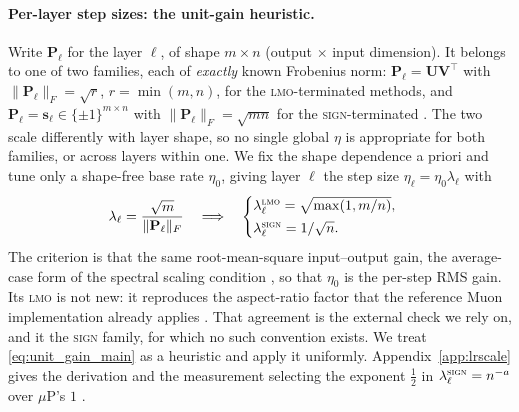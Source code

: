 \paragraph{Per-layer step sizes: the unit-gain heuristic.} Write $\mathbf{P}_\ell$ for the  layer $\ell$, of shape $m\times n$ (output $\times$ input dimension). It belongs to one of two families, each of \emph{exactly} known Frobenius norm: $\mathbf{P}_\ell=\mathbf{U}\mathbf{V}^\top$ with $\|\mathbf{P}_\ell\|_F=\sqrt{r}$, $r=\min(m,n)$, for the \textsc{lmo}-terminated methods, and $\mathbf{P}_\ell=\mathbf{s}_\ell\in\{\pm1\}^{m\times n}$ with $\|\mathbf{P}_\ell\|_F=\sqrt{mn}$ for the \textsc{sign}-terminated .  The two scale differently with layer shape, so no single global $\eta$ is appropriate for both families, or across layers within one. We fix the shape dependence a priori and tune only a shape-free base rate $\eta_0$, giving layer $\ell$ the step size $\eta_\ell=\eta_0\lambda_\ell$ with
\begin{equation}
\label{eq:unit_gain_main}
\lambda_\ell=\frac{\sqrt{m}}{\|\mathbf{P}_\ell\|_F}
\quad\Longrightarrow\quad
\begin{cases}
\lambda_\ell^{\textsc{lmo}}=\sqrt{\max(1,m/n)},\\[2pt]
\lambda_\ell^{\textsc{sign}}=1/\sqrt{n}.
\end{cases}
\end{equation}
The criterion is that  the same root-mean-square input--output gain, the average-case form of the spectral scaling condition \citep{yang2023spectral,large2024modular}, so that $\eta_0$ is the per-step RMS gain. Its \textsc{lmo}  is not new: it reproduces the aspect-ratio factor that the reference Muon implementation already applies \citep{jordan2024muon}. That agreement is the external check we rely on, and it  the \textsc{sign} family, for which no such convention exists. We treat \eqref{eq:unit_gain_main} as a heuristic and apply it uniformly. Appendix~\ref{app:lrscale} gives the derivation and the measurement selecting the exponent $\tfrac12$ in $\lambda_\ell^{\textsc{sign}}=n^{-a}$ over $\mu$P's $1$ \citep{yang2021tuning}.

